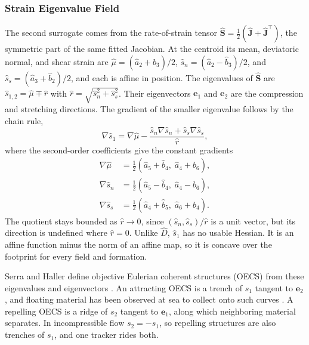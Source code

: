 \documentclass[lettersize,journal]{IEEEtran}
\begin{document}
\subsubsection{Strain Eigenvalue Field}
The second surrogate comes from the rate-of-strain tensor
$\hat{\mathbf{S}} = \tfrac{1}{2}(\hat{\mathbf{J}} + \hat{\mathbf{J}}^{\top})$,
the symmetric part of the same fitted Jacobian.
At the centroid its mean, deviatoric normal, and shear strain are
$\hat{\mu} = (\hat{a}_2 + \hat{b}_3)/2$,
$\hat{s}_n = (\hat{a}_2 - \hat{b}_3)/2$, and
$\hat{s}_s = (\hat{a}_3 + \hat{b}_2)/2$, and each is affine in position.
The eigenvalues of $\hat{\mathbf{S}}$ are
$\hat{s}_{1,2} = \hat{\mu} \mp \hat{r}$ with
$\hat{r} = \sqrt{\hat{s}_n^2 + \hat{s}_s^2}$. Their eigenvectors
$\mathbf{e}_1$ and $\mathbf{e}_2$ are the compression and stretching
directions. The gradient of the smaller eigenvalue follows by the chain
rule,
\begin{equation}
    \nabla\hat{s}_1 = \nabla\hat{\mu}
        - \frac{\hat{s}_n\nabla\hat{s}_n + \hat{s}_s\nabla\hat{s}_s}{\hat{r}},
    \label{eq:grad_s1}
\end{equation}
where the second-order coefficients give the constant gradients
\begin{equation}
    \begin{aligned}
        \nabla\hat{\mu} &= \tfrac{1}{2}(\hat{a}_5 + \hat{b}_4,\; \hat{a}_4 + \hat{b}_6), \\
        \nabla\hat{s}_n &= \tfrac{1}{2}(\hat{a}_5 - \hat{b}_4,\; \hat{a}_4 - \hat{b}_6), \\
        \nabla\hat{s}_s &= \tfrac{1}{2}(\hat{a}_4 + \hat{b}_5,\; \hat{a}_6 + \hat{b}_4).
    \end{aligned}
    \label{eq:grad_strain}
\end{equation}
The quotient stays bounded as $\hat{r} \to 0$, since $(\hat{s}_n, \hat{s}_s)/\hat{r}$
is a unit vector, but its direction is undefined where $\hat{r} = 0$. Unlike $\hat{D}$, $\hat{s}_1$ has no
usable Hessian. It is an affine function minus the norm of an affine
map, so it is concave over the footprint for every field and formation.

Serra and Haller define objective Eulerian coherent structures (OECS)
from these eigenvalues and eigenvectors \cite{19}. An attracting OECS is a
trench of $s_1$ tangent to $\mathbf{e}_2$, and floating material has been
observed at sea to collect onto such curves \cite{12}. A repelling OECS is a
ridge of $s_2$ tangent to $\mathbf{e}_1$, along which neighboring
material separates. In incompressible flow $s_2 = -s_1$, so repelling
structures are also trenches of $s_1$, and one tracker rides both.
\end{document}
